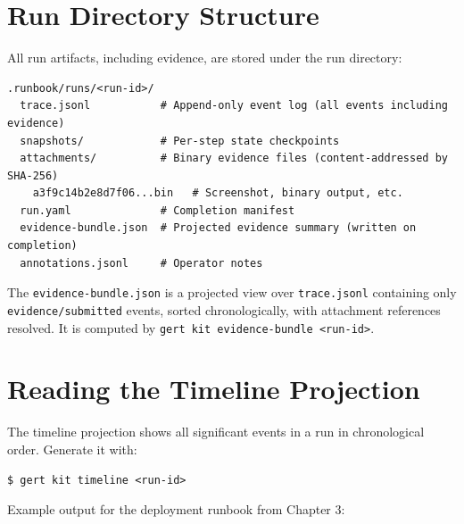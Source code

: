 \section{Run Directory Structure}
\label{sec:evidence-run-directory}

All run artifacts, including evidence, are stored under the run directory:

\begin{verbatim}
.runbook/runs/<run-id>/
  trace.jsonl           # Append-only event log (all events including evidence)
  snapshots/            # Per-step state checkpoints
  attachments/          # Binary evidence files (content-addressed by SHA-256)
    a3f9c14b2e8d7f06...bin   # Screenshot, binary output, etc.
  run.yaml              # Completion manifest
  evidence-bundle.json  # Projected evidence summary (written on completion)
  annotations.jsonl     # Operator notes
\end{verbatim}

The \texttt{evidence-bundle.json} is a projected view over \texttt{trace.jsonl} containing
only \texttt{evidence/submitted} events, sorted chronologically, with attachment references
resolved. It is computed by \texttt{gert kit evidence-bundle <run-id>}.

\section{Reading the Timeline Projection}
\label{sec:evidence-timeline}

The timeline projection shows all significant events in a run in chronological order. Generate
it with:

\begin{verbatim}
$ gert kit timeline <run-id>
\end{verbatim}

Example output for the deployment runbook from Chapter 3:

